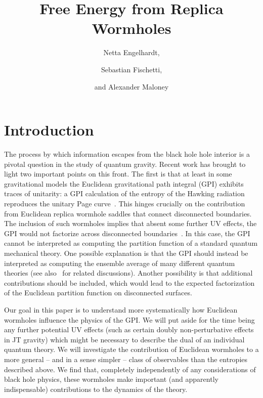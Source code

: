 \documentclass[12pt]{article}
\title{Free Energy from Replica Wormholes}
\author[1]{Netta Engelhardt,}
\author[2]{Sebastian Fischetti,}
\author[2]{and Alexander Maloney}
\affiliation[1]{Center for Theoretical Physics,\\
Massachusetts Institute of Technology, Cambridge, MA 02139, USA}
\affiliation[2]{Department of Physics, McGill University, Montr\'eal, QC, H3A 2T8, Canada}
\begin{document}
\maketitle


\section{Introduction}
\label{sec:intro}

The process by which information escapes from the black hole hole interior is a pivotal question in the study of quantum gravity.  Recent work has brought to light two important points on this front.  The first is that at least in some gravitational models the Euclidean gravitational path integral (GPI) exhibits traces of unitarity: a GPI calculation of the entropy of the Hawking radiation reproduces the unitary Page curve~\cite{Pen19, AEMM, BouTom19, PenShe19, AlmHar19, MarMax20, GidTur20, HarSha20, GauFri20}. This hinges crucially on the contribution from Euclidean replica wormhole saddles that connect disconnected boundaries.  The inclusion of such wormholes implies that absent some further UV effects, the GPI would not factorize across disconnected boundaries~\cite{Col88, GidStr88,GidStr88a, MalMao04, ArkOrg07}.  In this case, the GPI cannot be interpreted as computing the partition function of a standard quantum mechanical theory.  One possible explanation is that the GPI should instead be interpreted as computing the ensemble average of many different quantum theories (see also~\cite{HarJaf18,StaWit19, Ill19, KapMah19} for related discussions).  Another possibility is that additional contributions should be included, which would lead to the expected factorization of the Euclidean partition function on disconnected surfaces. 

Our goal in this paper is to understand more systematically how Euclidean wormholes influence the physics of the GPI.  We will put aside for the time being any further potential UV effects (such as certain doubly non-perturbative effects in JT gravity) which might be necessary to describe the dual of an individual quantum theory.  We will investigate the contribution of Euclidean wormholes to a more general -- and in a sense simpler -- class of observables than the entropies described above.  We find that, completely independently of any considerations of black hole physics, these wormholes make important (and apparently indispensable) contributions to the dynamics of the theory.
\end{document}
